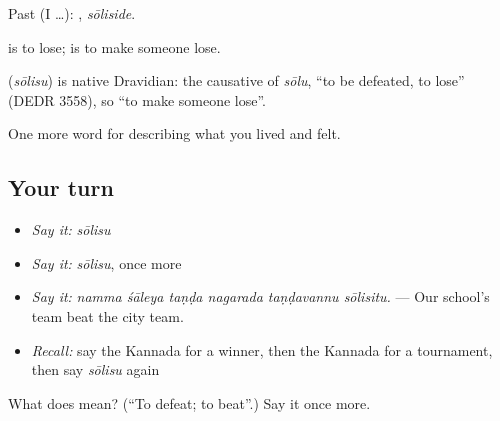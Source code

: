 Past (I …): , \emph{sōliside}.

 is to lose;  is to make someone lose.

\begin{cousinweb}
\textbf{} (\emph{sōlisu}) is native Dravidian: the causative of \emph{sōlu}, \textquotedblleft{}to be defeated, to lose\textquotedblright{} (DEDR 3558), so \textquotedblleft{}to make someone lose\textquotedblright{}.
\end{cousinweb}

\begin{grammarlens}[title={What you've built}]
One more word for describing what you lived and felt.
\end{grammarlens}

\subsection*{Your turn}
\begin{itemize}
\raggedright
  \item \emph{Say it:} \emph{sōlisu}
  \item \emph{Say it:} \emph{sōlisu}, once more
  \item \emph{Say it:} \emph{namma śāleya taṇḍa nagarada taṇḍavannu sōlisitu.} — Our school's team beat the city team.
  \item \emph{Recall:} say the Kannada for a winner, then the Kannada for a tournament, then say \emph{sōlisu} again
\end{itemize}

\begin{tcolorbox}[breakable,colback=teal!4,colframe=teal!35!black,title={Before you move on}]
What does  mean? (\textquotedblleft{}To defeat; to beat\textquotedblright{}.) Say it once more.
\end{tcolorbox}
